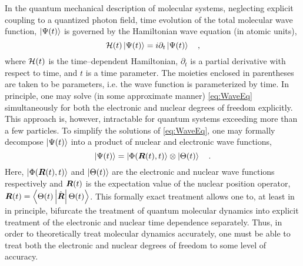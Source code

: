 In the quantum mechanical description of molecular systems, neglecting explicit
coupling to a quantized photon field, time evolution of the total molecular wave
function, $\left\vert \Psi (t) \right\rangle$ is governed by the Hamiltonian wave equation 
(in atomic units),
\begin{equation}
\mathcal{H}(t) \left\vert \Psi (t) \right\rangle = i\partial_t \left\vert \Psi(t) \right\rangle \quad,
\label{eq:WaveEq}
\end{equation}
where $\mathcal{H}(t)$ is the time--dependent Hamiltonian, $\partial_t$ is a partial
derivative with respect to time, and $t$ is a time parameter.  The moieties
enclosed in parentheses are taken to be parameters, i.e. the wave function is
parameterized by time.  In principle, one may solve (in some approximate manner)
\cref{eq:WaveEq} simultaneously for both the electronic and nuclear degrees of
freedom explicitly. This approach is, however, intractable for quantum systems
exceeding more than a few particles. To simplify the solutions of
\cref{eq:WaveEq}, one may formally decompose $\left\vert \Psi (t) \right\rangle$ into a product of
nuclear and electronic wave functions,
\begin{equation} 
\left\vert \Psi (t) \right\rangle = \left\vert \Phi(\boldsymbol{R}(t),t) \right\rangle\otimes\left\vert \Theta(t) \right\rangle 
\quad .  
\label{eq:exactSepElecNuc}
\end{equation} 
Here, $\left\vert \Phi(\boldsymbol{R}(t),t) \right\rangle$ and $\left\vert \Theta (t) \right\rangle$ are the electronic and
nuclear wave functions respectively and $\boldsymbol{R}(t)$ is the expectation value of
the nuclear position operator, $\boldsymbol{R}(t) =
\left\langle \Theta(t) \left\vert \hat{\boldsymbol{R}} \right\vert \Theta(t) \right\rangle$.  
This formally exact treatment\cite{Gross10_PRL123002, Cederbaum08_JCP124101,
Ghosh15_MP1} allows one to, at least in in principle, bifurcate the treatment of
quantum molecular dynamics into explicit treatment of the electronic and nuclear
time dependence separately.  Thus, in order to theoretically treat molecular
dynamics accurately, one must be able to treat both the electronic and nuclear
degrees of freedom to some level of accuracy.

